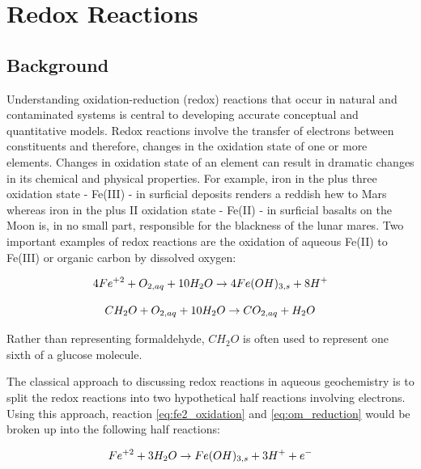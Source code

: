 \chapter{Redox Reactions}
\def\shorttitle{Redox Reactions} 
\section[Background]{Background}

Understanding oxidation-reduction (redox) reactions that occur in natural 
and contaminated systems is central to developing accurate conceptual and 
quantitative models. Redox reactions involve the transfer of electrons 
between constituents and therefore, changes in the oxidation state of 
one or more elements.  Changes in oxidation state of an element can 
result in dramatic changes in its chemical and physical properties.  
For example, iron in the plus three oxidation 
state - Fe(III) - in surficial deposits renders 
a reddish hew to Mars whereas iron in the plus II oxidation 
state - Fe(II) - in surficial basalts on the Moon is, in no 
small part, responsible for the blackness of the lunar mares. 
Two important examples of redox reactions are the oxidation 
of aqueous Fe(II) to Fe(III) or organic carbon by dissolved oxygen:

\begin{equation}
4Fe^{+2} + O_{2,aq} + 10H_2O \rightarrow 4Fe(OH)_{3,s} + 8H^+  \\
\label{eq:fe2_oxidation}
\end{equation}

\begin{equation}
CH_2O  + O_{2,aq} + 10H_2O \rightarrow CO_{2,aq} + H_2O \\
\label{eq:om_reduction}
\end{equation}

Rather than representing formaldehyde, $CH_2O$ is often used to represent 
one sixth of a glucose molecule.

The classical approach to discussing redox reactions in aqueous geochemistry 
is to split the redox reactions into two hypothetical 
half reactions involving electrons. 
Using this approach, reaction \ref{eq:fe2_oxidation} and \ref{eq:om_reduction} 
would be broken up into the following half reactions:

\begin{equation}
Fe^{+2} + 3H_2O  \rightarrow Fe(OH)_{3,s} + 3H^+ + e^-  \\
\label{eq:fe_half_reac}
\end{equation}


